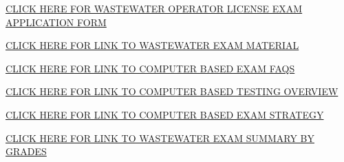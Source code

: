 \documentclass{article}
\begin{document}
\begin{tcolorbox}[width=17cm,box align=center, halign=center,  valign=center,colback={my-blue},title={}, colbacktitle=yellow,coltitle=blue]    
\href{https://www.waterboards.ca.gov/water_issues/programs/operator_certification/docs/forms/exam_app.pdf}{CLICK HERE FOR WASTEWATER OPERATOR LICENSE EXAM APPLICATION FORM}
\end{tcolorbox} 

\begin{tcolorbox}[width=17cm,box align=center, halign=center,  valign=center,colback={my-blue},title={}, colbacktitle=yellow,coltitle=blue]    
\href{https://drive.google.com/drive/folders/1zZqhq0f-6Ts4zeHfPE3xaIML0KHDyjzm?usp=sharing}{CLICK HERE FOR LINK TO WASTEWATER EXAM MATERIAL}
\end{tcolorbox}

\begin{tcolorbox}[width=17cm,box align=center, halign=center,  valign=center,colback={my-blue},title={}, colbacktitle=yellow,coltitle=blue]    
\href{https://drive.google.com/file/d/1HLpG_eoiTMuZYX40JndYXzKpx7GLPo3X/view?usp=sharing}{CLICK HERE FOR LINK TO COMPUTER BASED EXAM FAQS}
\end{tcolorbox}

\begin{tcolorbox}[width=17cm,box align=center, halign=center,  valign=center,colback={my-blue},title={}, colbacktitle=yellow,coltitle=blue]    
\href{https://drive.google.com/file/d/1eXn6HIU0P0hpKcFrkv180VXgavw03iT7/view?usp=share_link}{CLICK HERE FOR LINK TO COMPUTER BASED TESTING OVERVIEW}
\end{tcolorbox}

\begin{tcolorbox}[width=17cm,box align=center, halign=center,  valign=center,colback={my-blue},title={}, colbacktitle=yellow,coltitle=blue]    
\href{https://drive.google.com/file/d/1vKWkFX7PSiBR25SA2nIYFGO2w9bMkO7k/view?usp=sharing}{CLICK HERE FOR LINK TO COMPUTER BASED EXAM STRATEGY}
\end{tcolorbox}

\begin{tcolorbox}[width=17cm,box align=center, halign=center,  valign=center,colback={my-blue},title={}, colbacktitle=yellow,coltitle=blue]    
\href{https://drive.google.com/file/d/1NEW8nDjjz6CzDiD4xNSFS-CyvmQoCbQJ/view?usp=sharing}{CLICK HERE FOR LINK TO WASTEWATER EXAM SUMMARY BY GRADES}
\end{tcolorbox}
\end{document}
